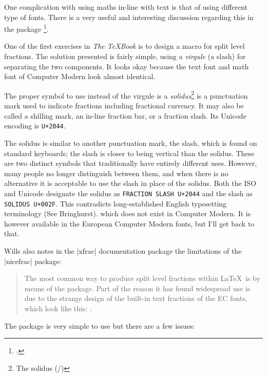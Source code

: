 One complication with using maths in-line with text is that of using different type of fonts. There is a very useful and interesting discussion regarding this in the package  \footcite{xfrac}. 

\begin{latexquotation}
 One of the first exercises in \emph{The \TeX Book} is to design a
 macro for split level fractions. The solution presented is fairly
  simple, using a \emph{virgule} (a slash) for separating the two
  components. It looks okay because the text font and math font of
  Computer Modern look almost identical.

  The proper symbol to use instead of the virgule is a \emph{solidus}\footnote{The solidus (/)}  is a punctuation mark used to indicate fractions including fractional currency. It may also be called a shilling mark, an in-line fraction bar, or a fraction slash. Its Unicode encoding is \texttt{U+2044}.
\end{latexquotation}

The solidus is similar to another punctuation mark, the slash, which is found on standard keyboards; the slash is closer to being vertical than the solidus. These are two distinct symbols that traditionally have entirely different uses. However, many people no longer distinguish between them, and when there is no alternative it is acceptable to use the slash in place of the solidus.
Both the ISO and Unicode designate the solidus as \texttt{FRACTION SLASH U+2044} and the slash as \texttt{SOLIDUS U+002F}. This contradicts long-established English typesetting terminology (See Bringhurst).
  which does not exist in Computer Modern. It is however available in
  the European Computer Modern fonts, but I'll get back to that.

Wills also notes in the |xfrac| documentation package the limitations
of the |nicefrac| package:

\begin{quotation}
  The most common way to produce split level fractions within \LaTeX\
  is by means of the  package. Part of the reason it
  has found widespread use is due to the strange design of the
  built-in text fractions of the EC fonts, which look like this:
  \textonehalf. 
\end{quotation}

The package is very simple to use but there are a few
issues:


